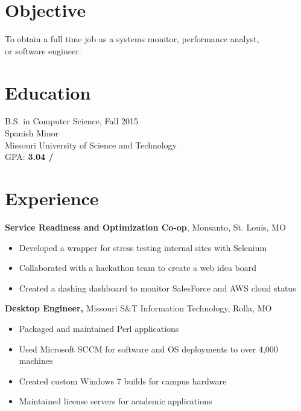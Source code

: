 \documentclass[margin]{res}
\begin{document}
 
 
   
  \address{{\bf Email:} billy.rhoades@mst.edu}
  \address{\url{http://brod.es/}}
   
  \begin{resume} 
   
    \section{Objective} 
    To obtain a full time job as a systems monitor, performance analyst, \\ or software engineer.

    \section{Education} 
      B.S. in Computer Science, Fall 2015 \\
      Spanish Minor \\
      Missouri University of Science and Technology \\
      GPA: {\bf 3.04 \slash {}}

    \section{Experience}
    {\bf Service Readiness and Optimization Co-op}, Monsanto, St. Louis, MO%
       \begin{itemize} \itemsep -1pt  %
         \item Developed a wrapper for stress testing internal sites with Selenium
         \item Collaborated with a hackathon team to create a web idea board 
         \item Created a dashing dashboard to monitor SalesForce and AWS cloud status
       \end{itemize}
     {\bf Desktop Engineer,} Missouri S\&T Information Technology, Rolla, MO%
       \begin{itemize} \itemsep -1pt  %
         \item Packaged and maintained Perl applications
         \item Used Microsoft SCCM for software and OS deployments to over 4,000 machines
         \item Created custom Windows 7 builds for campus hardware
         \item Maintained license servers for academic applications
       \end{itemize}


\end{resume}
\end{document}
